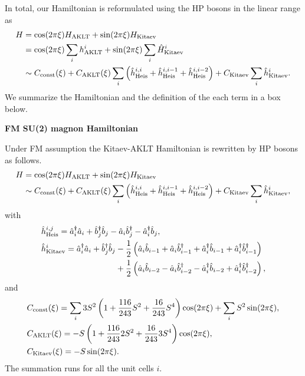 \documentclass[11pt, aps, longbibliography]{article}
\begin{document}
In total, our Hamiltonian is reformulated using the HP bosons in the linear range as
\begin{align}
    H &= \cos(2\pi \xi)H_{\rm AKLT} + \sin(2\pi \xi)H_{\rm Kitaev} \notag \\
    &=\cos(2\pi \xi)\sum_{i}h_{\rm AKLT}^{i} + \sin(2\pi \xi)\sum_{i}\hat{H}_{\rm Kitaev}^i \notag \\
    &\sim C_{\rm const}(\xi) + C_{\rm AKLT}(\xi)\sum_{i}\left( \hat{h}_{\rm Heis}^{i,i} + \hat{h}_{\rm Heis}^{i,i-1} + \hat{h}_{\rm Heis}^{i,i-2} \right) + C_{\rm Kitaev} \sum_{i} \hat{h}_{\rm Kitaev}^i.
\end{align}
We summarize the Hamiltonian and the definition of the each term in a box below.
\begin{tcolorbox}
    \textbf{FM SU(2) magnon Hamiltonian}

    Under FM assumption the Kitaev-AKLT Hamiltonian is rewritten by HP bosons as follows.
    \begin{align}
        H &= \cos(2\pi \xi)H_{\rm AKLT} + \sin(2\pi \xi)H_{\rm Kitaev} \notag \\
        &\sim C_{\rm const}(\xi) + C_{\rm AKLT}(\xi)\sum_{i}\left( \hat{h}_{\rm Heis}^{i,i} + \hat{h}_{\rm Heis}^{i,i-1} + \hat{h}_{\rm Heis}^{i,i-2} \right) + C_{\rm Kitaev} \sum_{i} \hat{h}_{\rm Kitaev}^i, \label{eq:Hamiltonian_LSWT_FM}
    \end{align}
    with
    \begin{align}
        &\hat{h}_{\rm Heis}^{i,j} = \hat{a}^\dagger_i \hat{a}_i + \hat{b}^\dagger_j \hat{b}_j - \hat{a}_i \hat{b}^{\dagger}_j - \hat{a}^\dagger_i \hat{b}_j, \label{eq:hHeis} \\
        &\hat{h}_{\rm Kitaev}^i =  \hat{a}^\dagger_i \hat{a}_i + \hat{b}^\dagger_j \hat{b}_j -\frac{1}{2}\left( \hat{a}_i\hat{b}_{i-1} + \hat{a}_i\hat{b}_{i-1}^\dagger + \hat{a}_i^\dagger \hat{b}_{i-1} + \hat{a}_i^\dagger\hat{b}_{i-1}^\dagger \right) \label{eq:hKitaev} \notag \\ 
        & \quad \quad \quad \quad \quad \quad \quad \quad \quad + \frac{1}{2} \left( \hat{a}_i\hat{b}_{i-2} - \hat{a}_i\hat{b}_{i-2}^\dagger - \hat{a}_i^\dagger \hat{b}_{i-2} + \hat{a}_i^\dagger\hat{b}_{i-2}^\dagger \right),
    \end{align}
    and
    \begin{align}
        &C_{\rm const}(\xi) = \sum_{i}3S^2\left( 1+\frac{116}{243}S^2 + \frac{16}{243}S^4 \right) \cos(2\pi \xi) + \sum_{i} S^2\sin(2\pi \xi), \\
        &C_{\rm AKLT}(\xi) = - S\left( 1+\frac{116}{243}2S^2 + \frac{16}{243}3S^4 \right)\cos(2\pi \xi), \\
        &C_{\rm Kitaev}(\xi) = -S \sin(2\pi \xi).
    \end{align}
    The summation runs for all the unit cells $i$.
\end{tcolorbox}
\end{document}
